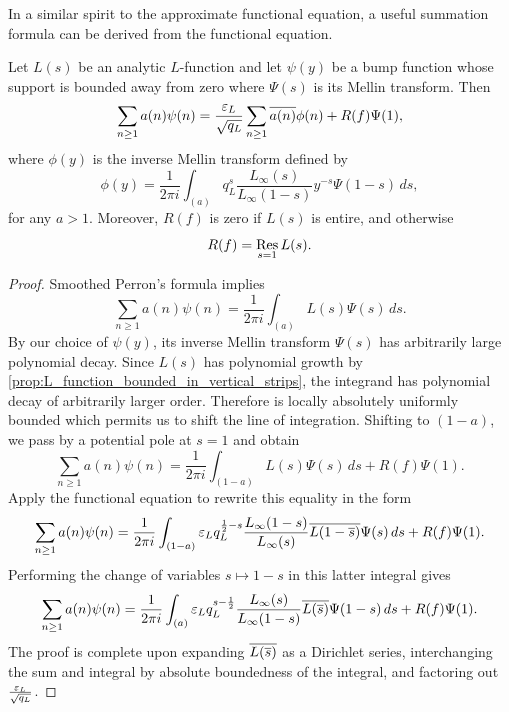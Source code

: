 \documentclass[12pt]{article}
\begin{document}
    In a similar spirit to the approximate functional equation, a useful summation formula can be derived from the functional equation.

    \begin{theorem}
      Let \(L(s)\) be an analytic \(L\)-function and let \(\psi(y)\) be a bump function whose support is bounded away from zero where \(\Psi(s)\) is its Mellin transform. Then
      \[
        \sum_{n \ge 1}a(n)\psi(n) = \frac{\varepsilon_{L}}{\sqrt{q_{L}}}\sum_{n \ge 1}\overline{a(n)}\phi(n)+R(f)\Psi(1),
      \]
      where \(\phi(y)\) is the inverse Mellin transform defined by
      \[
        \phi(y) = \frac{1}{2\pi i}\int_{(a)}q_{L}^{s}\frac{L_{\infty}(s)}{L_{\infty}(1-s)}y^{-s}\Psi(1-s)\,ds,
      \]
      for any \(a > 1\). Moreover, \(R(f)\) is zero if \(L(s)\) is entire, and otherwise
      \[
        R(f) = \operatorname*{\mathrm{Res}}_{s = 1}L(s).
      \]
    \end{theorem}
    \begin{proof}
      Smoothed Perron's formula implies
      \[
        \sum_{n \ge 1}a(n)\psi(n) = \frac{1}{2\pi i}\int_{(a)}L(s)\Psi(s)\,ds.
      \]
      By our choice of \(\psi(y)\), its inverse Mellin transform \(\Psi(s)\) has arbitrarily large polynomial decay. Since \(L(s)\) has polynomial growth by \cref{prop:L_function_bounded_in_vertical_strips}, the integrand has polynomial decay of arbitrarily larger order. Therefore is locally absolutely uniformly bounded which permits us to shift the line of integration. Shifting to \((1-a)\), we pass by a potential pole at \(s = 1\) and obtain
      \[
        \sum_{n \ge 1}a(n)\psi(n) = \frac{1}{2\pi i}\int_{(1-a)}L(s)\Psi(s)\,ds+R(f)\Psi(1).
      \]
      Apply the functional equation to rewrite this equality in the form
      \[
        \sum_{n \ge 1}a(n)\psi(n) = \frac{1}{2\pi i}\int_{(1-a)}\varepsilon_{L}q_{L}^{\frac{1}{2}-s}\frac{L_{\infty}(1-s)}{L_{\infty}(s)}\overline{L(1-\overline{s})}\Psi(s)\,ds+R(f)\Psi(1).
      \]
      Performing the change of variables \(s \mapsto 1-s\) in this latter integral gives
      \[
        \sum_{n \ge 1}a(n)\psi(n) = \frac{1}{2\pi i}\int_{(a)}\varepsilon_{L}q_{L}^{s-\frac{1}{2}}\frac{L_{\infty}(s)}{L_{\infty}(1-s)}\overline{L(\overline{s})}\Psi(1-s)\,ds+R(f)\Psi(1).
      \]
      The proof is complete upon expanding \(\overline{L(\overline{s})}\) as a Dirichlet series, interchanging the sum and integral by absolute boundedness of the integral, and factoring out \(\frac{\varepsilon_{L}}{\sqrt{q_{L}}}\).
    \end{proof}
    \iffalse
\end{document}
